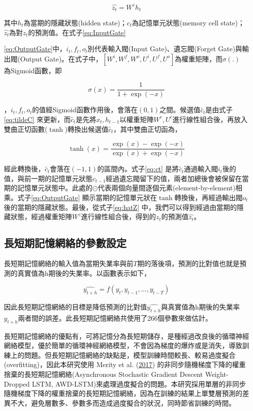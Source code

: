 \documentclass[oneside]{book}
\begin{document}
\begin{equation} 
   \hat{z_t} = W^zh_t
  \label{eq:hatZ}
\end{equation}

其中\(h_t\)為當期的隱藏狀態(hidden state)；\(c_t\)為記憶單元狀態(memory cell state)；\(\hat{z_t}\)為對\(z_t\)的預測值。在式子\eqref{eq:InputGate}

\eqref{eq:OutputGate}中，\(i_t,f_t,o_t\)別代表輸入閥(Input Gate)、遺忘閥(Forget Gate)與輸出閥(Output Gate)。在式子中，\([W^i,W^f,W^o,U^i,U^f,U^o]\)為權重矩陣，而\(\sigma(.)\)
為Sigmoid函數，即

\[
\sigma(x)=\frac{1}{1+\exp(-x)}
\]

，\(i_t,f_t,o_t\)的值經Sigmoid函數作用後，會落在\((0,1)\)之間。候選值\(\tilde{c_t}\)是由式子\eqref{eq:tildeC} 來更新，而\(\tilde{c_t}\)是先將\(x_t, h_{t-1}\)以權重矩陣\(W^c,U^c\)進行線性組合後，再放入雙曲正切函數(\(\tanh\))轉換出候選值\(\tilde{c_t}\)，其中雙曲正切函為，

\[\tanh(x) = \frac{\exp(x)-\exp(-x)}{\exp(x)+\exp(-x)}\]

經此轉換後，\(\tilde{c_t}\)會落在\((-1,1)\)的區間內。式子\eqref{eq:ct} 是將\(\tilde{c_t}\)通過輸入閥\(i_t\)後的值，與前一期的記憶單元狀態\(c_{t-1}\)經過遺忘閥留下的值，兩者加總後會被保留在當期的記憶單元狀態中。此處的\(\odot\)代表兩個向量間逐個元素(element-by-element)相乘。式子\eqref{eq:OutputGate} 顯示當期的記憶單元狀在\(\tanh\)轉換後，再經過輸出閥\(o_t\)後的當期的隱藏狀態。最後，從式子\eqref{eq:hatZ} 中，我們可以得到經過由當期的隱藏狀態，經過權重矩陣\(W^z\)進行線性組合後，得到的\(z_t\)的預測值\(\hat{z_t}\)。

\hypertarget{ux9577ux77edux671fux8a18ux61b6ux7db2ux7d61ux7684ux53c3ux6578ux8a2dux5b9a}{%
\subsection{長短期記憶網絡的參數設定}\label{ux9577ux77edux671fux8a18ux61b6ux7db2ux7d61ux7684ux53c3ux6578ux8a2dux5b9a}}

長短期記憶網絡的輸入值為當期失業率與前\(T\)期的落後項，預測的比對值也就是預測的真實值為h期後的失業率。以函數表示如下，

\[
\hat{y_{t+h}} = f(y_t, y_{t-1}, ..., y_{t-T})
\]

因此長短期記憶網絡的目標是降低預測的比對值\(\hat{y_{t+h}}\)與真實值為h期後的失業率\(y_{t+h}\)兩者間的誤差。此長短期記憶網絡共使用了266個參數來做估計。

長短期記憶網絡的優點有，可將記憶分為長短期儲存，是種經過改良後的循環神經網絡模型，優於簡單的循環神經網絡模型，不會因為梯度的爆炸或是消失，導致訓練上的問題。但長短期記憶網絡的缺點是，模型訓練時間較長、較易過度擬合(overfitting)，因此本研究使用 Merity et al. (\protect\hyperlink{ref-merityRegularizingOptimizingLSTM2017}{2017}) 的非同步隨機梯度下降的權重捨棄的長短期記憶網絡(Asynchronous Stochastic Gradient Descent Weight-Dropped LSTM, AWD-LSTM)來處理過度擬合的問題。本研究採用單層的非同步隨機梯度下降的權重捨棄的長短期記憶網絡，因為在訓練的結果上單雙層預測的差異不大，避免層數多、參數多而造成過度擬合的狀況，同時節省訓練的時間。
\end{document}
